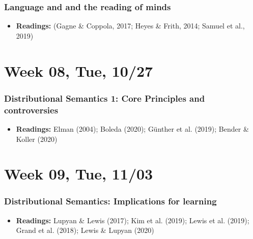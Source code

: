 \documentclass[11pt,man]{article}
\providecommand{\tightlist}{%
  \setlength{\itemsep}{0pt}\setlength{\parskip}{0pt}}
\begin{document}
\hypertarget{language-and-and-the-reading-of-minds}{%
\subsubsection{Language and and the reading of
minds}\label{language-and-and-the-reading-of-minds}}

\begin{itemize}
\tightlist
\item
  \textbf{Readings:} (Gagne \& Coppola, 2017; Heyes \& Frith, 2014;
  Samuel et al., 2019)
\end{itemize}

\hypertarget{week-08-tue-1027}{%
\section{Week 08, Tue, 10/27}\label{week-08-tue-1027}}

\hypertarget{distributional-semantics-1-core-principles-and-controversies}{%
\subsubsection{Distributional Semantics 1: Core Principles and
controversies}\label{distributional-semantics-1-core-principles-and-controversies}}

\begin{itemize}
\tightlist
\item
  \textbf{Readings:} Elman (2004); Boleda (2020); Günther et al. (2019);
  Bender \& Koller (2020)
\end{itemize}

\hypertarget{week-09-tue-1103}{%
\section{Week 09, Tue, 11/03}\label{week-09-tue-1103}}

\hypertarget{distributional-semantics-implications-for-learning}{%
\subsubsection{Distributional Semantics: Implications for
learning}\label{distributional-semantics-implications-for-learning}}

\begin{itemize}
\tightlist
\item
  \textbf{Readings:} Lupyan \& Lewis (2017); Kim et al. (2019); Lewis et
  al. (2019); Grand et al. (2018); Lewis \& Lupyan (2020)
\end{itemize}
\end{document}
